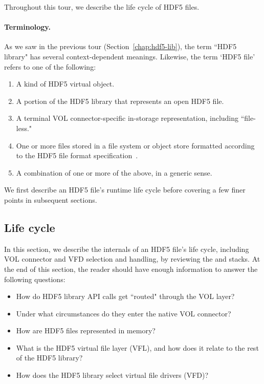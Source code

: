 


Throughout this tour, we describe the life cycle of HDF5 files.

\paragraph{Terminology.} As we saw in the previous tour (Section~\ref{chap:hdf5-lib}), the term ``HDF5 library" has several context-dependent meanings. Likewise, the term `HDF5 file' refers to one of the following:

\begin{enumerate}
    \item A kind of HDF5 virtual object.
    \item A portion of the HDF5 library that represents an open HDF5 file.
    \item A terminal VOL connector-specific in-storage representation, including ``file-less."
    \item One or more files stored in a file system or object store formatted according to the HDF5 file format specification~\cite{ffmt}.
    \item A combination of one or more of the above, in a generic sense.
\end{enumerate}

We first describe an HDF5 file’s runtime life cycle before covering a few finer points in subsequent sections.

\subsection{Life cycle}

In this section, we describe the internals of an HDF5 file's life cycle, including VOL connector and VFD selection and handling, by reviewing the  and  stacks. At the end of this section, the reader should have enough information to answer the following questions:

\begin{itemize}
    \item How do HDF5 library API calls get ``routed" through the VOL layer?
    \item Under what circumstances do they enter the native VOL connector?
    \item How are HDF5 files represented in memory?
    \item What is the HDF5 virtual file layer (VFL), and how does it relate to the rest of the HDF5 library?
    \item How does the HDF5 library select virtual file drivers (VFD)?
\end{itemize}


